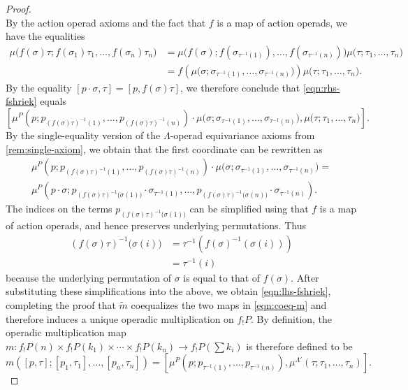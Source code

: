 \begin{proof}
\begin{equation}
\end{equation}
By the action operad axioms and the fact that $f$ is a map of action operads, we have the equalities
\begin{align*}
\mu\big( f(\sigma)\tau; f(\sigma_1)\tau_1, \ldots, f(\sigma_n)\tau_n\big) &= \mu\big( f(\sigma); f(\sigma_{\tau^{-1}(1)}), \ldots, f(\sigma_{\tau^{-1}(n)})\big)\mu\big( \tau; \tau_1, \ldots, \tau_n\big) \\
& = f\left(\mu\big( \sigma; \sigma_{\tau^{-1}(1)}, \ldots, \sigma_{\tau^{-1}(n)}\big) \right)\mu\big( \tau; \tau_1, \ldots, \tau_n\big).
\end{align*}
By the equality $[p\cdot \sigma, \tau] = [p, f(\sigma)\tau]$, we therefore conclude that \cref{eqn:rhs-fshriek} equals
\[
\left[\mu^P(p; p_{(f(\sigma)\tau)^{-1}(1)}, \ldots, p_{(f(\sigma)\tau)^{-1}(n)}) \cdot \mu\big( \sigma; \sigma_{\tau^{-1}(1)}, \ldots, \sigma_{\tau^{-1}(n)}\big), \mu\big( \tau; \tau_1, \ldots, \tau_n\big) \right].
\]
By the single-equality version of the $\Lambda$-operad equivariance axioms from \cref{rem:single-axiom}, we obtain that the first coordinate can be rewritten as
\begin{align*}
\mu^P(p; p_{(f(\sigma)\tau)^{-1}(1)}, \ldots, p_{(f(\sigma)\tau)^{-1}(n)}) \cdot \mu\big( \sigma; \sigma_{\tau^{-1}(1)}, \ldots, \sigma_{\tau^{-1}(n)}\big) = \\
\mu^P(p\cdot \sigma; p_{(f(\sigma)\tau)^{-1}\big( \sigma(1) \big)}\cdot \sigma_{\tau^{-1}(1)}, \ldots, p_{(f(\sigma)\tau)^{-1}\big( \sigma(n) \big)}\cdot \sigma_{\tau^{-1}(n)}). 
\end{align*}
The indices on the terms $p_{(f(\sigma)\tau)^{-1}\big( \sigma(1) \big)}$ can be simplified using that $f$ is a map of action operads, and hence preserves underlying permutations. Thus 
\begin{align*}
(f(\sigma)\tau)^{-1}\big( \sigma(i) \big) & = \tau^{-1}\left( f(\sigma)^{-1}\left( \sigma(i) \right) \right) \\
& = \tau^{-1}(i)
\end{align*}
because the underlying permutation of $\sigma$ is equal to that of $f(\sigma)$. After substituting these simplifications into the above, we obtain \cref{eqn:lhs-fshriek}, completing the proof that $\tilde{m}$ coequalizes the two maps in \cref{eqn:coeq-m} and therefore induces a unique operadic multiplication on $f_{!}P$. By definition, the operadic multiplication map $m \colon f_{!}P(n) \times f_{!}P(k_1) \times \cdots \times f_{!}P(k_n) \to f_{!}P\left( \sum k_i\right)$ is therefore defined to be
\[
m\left( [p,\tau]; [p_1, \tau_1], \ldots, [p_n, \tau_n]\right) = \left[ \mu^P(p; p_{\tau^{-1}(1)}, \ldots, p_{\tau^{-1}(n)}), \mu^{\Lambda'}(\tau; \tau_1, \ldots, \tau_n) \right].
\]


\end{proof}
